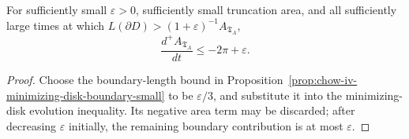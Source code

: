 \begin{lemma}
\label{lem:chow-iv-area-decay-long-boundary}
For sufficiently small \(\varepsilon>0\), sufficiently small truncation area,
and all sufficiently large times at which
\(L(\partial D)>(1+\varepsilon)^{-1}A_{\mathfrak T_A}\),
\[
 \frac{d^+A_{\mathfrak T_A}}{dt}\le-2\pi+\varepsilon.
\]
\end{lemma}

\begin{proof}
Choose the boundary-length bound in Proposition~\ref{prop:chow-iv-minimizing-disk-boundary-small}
to be \(\varepsilon/3\), and substitute it into the minimizing-disk evolution
inequality.  Its negative area term may be discarded; after decreasing
\(\varepsilon\) initially, the remaining boundary contribution is at most
\(\varepsilon\).
\end{proof}
